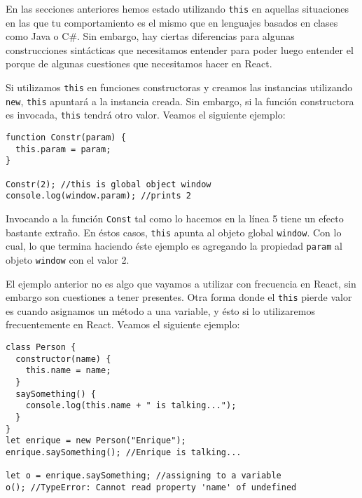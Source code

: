 \documentclass[a4paper, oneside, titlepage, 12pt]{book}
\begin{document}
En las secciones anteriores hemos estado utilizando \texttt{this} en aquellas situaciones en las que tu comportamiento es el mismo que en lenguajes basados en clases como Java o C\#. Sin embargo, hay ciertas diferencias para algunas construcciones sintácticas que necesitamos entender para poder luego entender el porque de algunas cuestiones que necesitamos hacer en React.
\newline

Si utilizamos \texttt{this} en funciones constructoras y creamos las instancias utilizando \texttt{new}, \texttt{this} apuntará a la instancia creada. Sin embargo, si la función constructora es invocada, \texttt{this} tendrá otro valor. Veamos el siguiente ejemplo:

\begin{verbatim}
function Constr(param) {
  this.param = param;
}

Constr(2); //this is global object window
console.log(window.param); //prints 2
\end{verbatim}

Invocando a la función \texttt{Const} tal como lo hacemos en la línea 5 tiene un efecto bastante extraño. En éstos casos, \texttt{this} apunta al objeto global \texttt{window}. Con lo cual, lo que termina haciendo éste ejemplo es agregando la propiedad \texttt{param} al objeto \texttt{window} con el valor 2.
\newline

El ejemplo anterior no es algo que vayamos a utilizar con frecuencia en React, sin embargo son cuestiones a tener presentes. Otra forma donde el \texttt{this} pierde valor es cuando asignamos un método a una variable, y ésto si lo utilizaremos frecuentemente en React. Veamos el siguiente ejemplo:

\begin{verbatim}
class Person {
  constructor(name) {
    this.name = name;
  }
  saySomething() {
    console.log(this.name + " is talking...");
  }
}
let enrique = new Person("Enrique");
enrique.saySomething(); //Enrique is talking...

let o = enrique.saySomething; //assigning to a variable
o(); //TypeError: Cannot read property 'name' of undefined
\end{verbatim}
\end{document}
